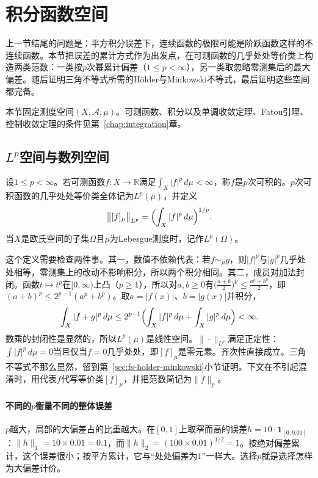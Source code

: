 
\section{积分函数空间}
\label{sec:fs-integral}

上一节结尾的问题是：平方积分误差下，连续函数的极限可能是阶跃函数这样的不连续函数。本节把误差的累计方式作为出发点，在可测函数的几乎处处等价类上构造两类范数：一类按$p$次幂累计偏差（$1\leq p<\infty$），另一类取忽略零测集后的最大偏差。随后证明三角不等式所需的Hölder与Minkowski不等式，最后证明这些空间都完备。

本节固定测度空间$(X,\mathcal A,\mu)$。可测函数、积分以及单调收敛定理、Fatou引理、控制收敛定理的条件见第~\ref{chap:integration}章。

\subsection{$L^p$空间与数列空间}
\label{sec:fs-lp}

\begin{definition}[$L^p$空间]
\label{def:fs-lp}
设$1\leq p<\infty$。若可测函数$f:X\to\mathbb R$满足$\int_X|f|^p\,d\mu<\infty$，称$f$是$p$次可积的。$p$次可积函数的几乎处处等价类全体记为$L^p(\mu)$，并定义
\[
 \bigl\|[f]_\mu\bigr\|_{L^p}=\Bigl(\int_X|f|^p\,d\mu\Bigr)^{1/p}.
\]
当$X$是欧氏空间的子集$\Omega$且$\mu$为Lebesgue测度时，记作$L^p(\Omega)$。
\end{definition}

这个定义需要检查两件事。其一，数值不依赖代表：若$f\sim_\mu g$，则$|f|^p$与$|g|^p$几乎处处相等，零测集上的改动不影响积分，所以两个积分相同。其二，成员对加法封闭。函数$t\mapsto t^p$在$[0,\infty)$上凸（$p\geq1$），所以对$a,b\geq0$有$\bigl(\tfrac{a+b}{2}\bigr)^p\leq\tfrac{a^p+b^p}{2}$，即$(a+b)^p\leq2^{p-1}(a^p+b^p)$。取$a=|f(x)|$、$b=|g(x)|$并积分，
\[
 \int_X|f+g|^p\,d\mu\leq2^{p-1}\Bigl(\int_X|f|^p\,d\mu+\int_X|g|^p\,d\mu\Bigr)<\infty .
\]
数乘的封闭性是显然的，所以$L^p(\mu)$是线性空间。$\|\cdot\|_{L^p}$满足正定性：$\int|f|^p\,d\mu=0$当且仅当$f=0$几乎处处，即$[f]_\mu$是零元素。齐次性直接成立。三角不等式不那么显然，留到第~\ref{sec:fs-holder-minkowski}小节证明。下文在不引起混淆时，用代表$f$代写等价类$[f]_\mu$，并把范数简记为$\|f\|_p$。

\paragraph{不同的$p$衡量不同的整体误差}
$p$越大，局部的大偏差占的比重越大。在$[0,1]$上取窄而高的误差$h=10\cdot\mathbf 1_{[0,0.01]}$：$\|h\|_1=10\times0.01=0.1$，而$\|h\|_2=(100\times0.01)^{1/2}=1$。按绝对偏差累计，这个误差很小；按平方累计，它与“处处偏差为$1$”一样大。选择$p$就是选择怎样为大偏差计价。

